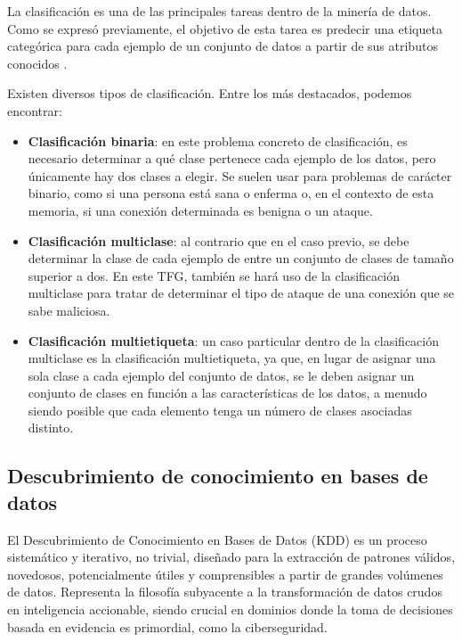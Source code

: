 La clasificación es una de las principales tareas dentro de la minería de datos.
Como se expresó previamente, el objetivo de esta tarea es predecir una etiqueta categórica para cada ejemplo de un conjunto de datos a partir de sus atributos conocidos \cite{hastie2009elements}.

Existen diversos tipos de clasificación. Entre los más destacados, podemos encontrar:

\begin{itemize}
    \item\textbf{Clasificación binaria}: en este problema concreto de clasificación, es necesario determinar a qué clase pertenece cada ejemplo de los datos, pero únicamente hay dos clases a elegir. Se suelen usar para problemas de carácter binario, como si una persona está sana o enferma o, en el contexto de esta memoria, si una conexión determinada es benigna o un ataque.
    
    \item\textbf{Clasificación multiclase}: al contrario que en el caso previo, se debe determinar la clase de cada ejemplo de entre un conjunto de clases de tamaño superior a dos. En este TFG, también se hará uso de la clasificación multiclase para tratar de determinar el tipo de ataque de una conexión que se sabe maliciosa.
    
    \item\textbf{Clasificación multietiqueta}: un caso particular dentro de la clasificación multiclase es la clasificación multietiqueta, ya que, en lugar de asignar una sola clase a cada ejemplo del conjunto de datos, se le deben asignar un conjunto de clases en función a las características de los datos, a menudo siendo posible que cada elemento tenga un número de clases asociadas distinto.

\end{itemize}

\subsection{Descubrimiento de conocimiento en bases de datos}

El Descubrimiento de Conocimiento en Bases de Datos (KDD) es un proceso sistemático y iterativo, no trivial, diseñado para la extracción de patrones válidos, novedosos, potencialmente útiles y comprensibles a partir de grandes volúmenes de datos. Representa la filosofía subyacente a la transformación de datos crudos en inteligencia accionable, siendo crucial en dominios donde la toma de decisiones basada en evidencia es primordial, como la ciberseguridad. 

